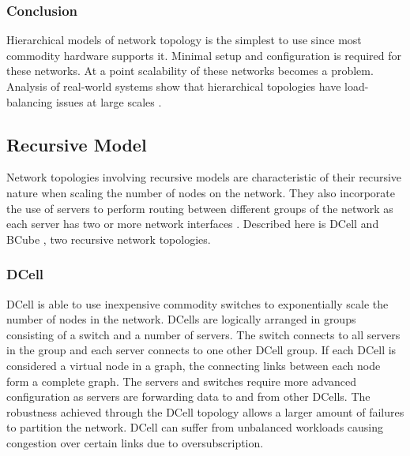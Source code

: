 \documentclass[12pt]{article}
\begin{document}

\subsubsection{Conclusion} \label{ssub:hierarchical-concl}


Hierarchical models of network topology is the simplest to use since most commodity hardware supports it. Minimal setup and configuration is required for these networks. At a point scalability of these networks becomes a problem. Analysis of real-world systems show that hierarchical topologies have load-balancing issues at large scales \cite{singla2012jellyfish}.



\subsection{Recursive Model} \label{sub:net-recursive}

Network topologies involving recursive models are characteristic of their recursive nature when scaling the number of nodes on the network. They also incorporate the use of servers to perform routing between different groups of the network as each server has two or more network interfaces \cite{wang2015survey, xia2016survey}. Described here is DCell \cite{guo2008dcell} and BCube \cite{guo2009bcube}, two recursive network topologies.

\subsubsection{DCell} \label{subp:dcell}

DCell is able to use inexpensive commodity switches to exponentially scale the number of nodes in the network. DCells are logically arranged in groups consisting of a switch and a number of servers. The switch connects to all servers in the group and each server connects to one other DCell group. If each DCell is considered a virtual node in a graph, the connecting links between each node form a complete graph. The servers and switches require more advanced configuration as servers are forwarding data to and from other DCells. The robustness achieved through the DCell topology allows a larger amount of failures to partition the network. DCell can suffer from unbalanced workloads causing congestion over certain links due to oversubscription.
\end{document}
